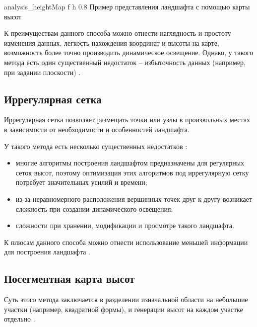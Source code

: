 \clearpage

{analysis_heightMap} %
{f} %
{h} %
{0.8\textwidth} %
{Пример представления ландшафта с помощью карты высот \cite{info_heightMap}} %

К преимуществам данного способа можно отнести наглядность и простоту изменения данных, легкость нахождения координат и высоты на карте, возможность более точно производить динамическое освещение. 
Однако, у такого метода есть один существенный недостаток -- избыточность данных (например, при задании плоскости) \cite{info_dataLandscapePresent}.

\subsection{Иррегулярная сетка}

Иррегулярная сетка позволяет размещать точки или узлы в произвольных местах в зависимости от необходимости и особенностей ландшафта.

У такого метода есть несколько существенных недостатков \cite{info_dataLandscapePresent}:

\begin{itemize}[label=--]
	\item многие алгоритмы построения ландшафтом предназначены для регулярных сеток высот, поэтому оптимизация этих алгоритмов под иррегулярную сетку потребует значительных усилий и времени;
	\item из-за неравномерного расположения вершинных точек друг к другу возникает сложность при создании динамического освещения;
	\item сложности при хранении, модификации и просмотре такого ландшафта.
\end{itemize}

К плюсам данного способа можно отнести использование меньшей информации для построения ландшафта \cite{info_dataLandscapePresent}. 

\subsection{Посегментная карта высот}

Суть этого метода заключается в разделении изначальной области на
небольшие участки (например, квадратной формы), и генерации высот на
каждом участке отдельно \cite{info_dataLandscapeSegment}.

